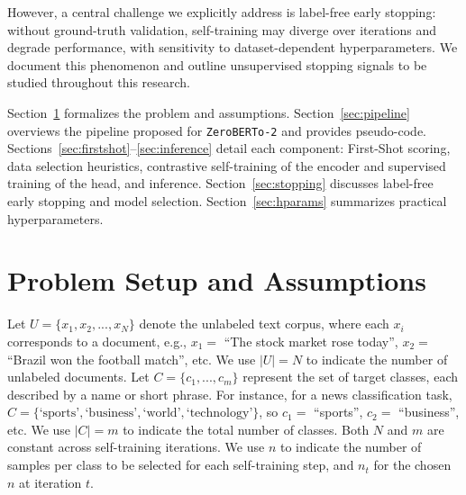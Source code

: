 \documentclass[]{politex-xico}
\begin{document}
However, a central challenge we explicitly address is label-free early stopping: without ground-truth validation, self-training may diverge over iterations and degrade performance, with sensitivity to dataset-dependent hyperparameters. We document this phenomenon and outline unsupervised stopping signals to be studied throughout this research.

Section~\ref{sec:setup} formalizes the problem and assumptions. Section~\ref{sec:pipeline} overviews the pipeline proposed for \texttt{ZeroBERTo-2} and provides pseudo-code. Sections~\ref{sec:firstshot}–\ref{sec:inference} detail each component: First-Shot scoring, data selection heuristics, contrastive self-training of the encoder and supervised training of the head, and inference. Section~\ref{sec:stopping} discusses label-free early stopping and model selection. Section~\ref{sec:hparams} summarizes practical hyperparameters.

\section{Problem Setup and Assumptions}
\label{sec:setup}


Let $U = \{x_1, x_2, ..., x_{N}\}$ denote the unlabeled text corpus, where each $x_i$ corresponds to a document, e.g., $x_1 =$ ``The stock market rose today'', $x_2 =$ ``Brazil won the football match'', etc. We use $|U| = N$ to indicate the number of unlabeled documents. Let $C = \{c_1, ..., c_m\}$ represent the set of target classes, each described by a name or short phrase. For instance, for a news classification task, $C = \{\text{‘sports’}, \text{‘business’}, \text{‘world’}, \text{‘technology’}\}$, so $c_1 = $ ``sports'', $c_2 = $ ``business'', etc. We use $|C| = m$ to indicate the total number of classes. Both $N$ and $m$ are constant across self-training iterations. We use $n$ to indicate the number of samples per class to be selected for each self-training step, and $n_t$ for the chosen $n$ at iteration $t$.
\end{document}
